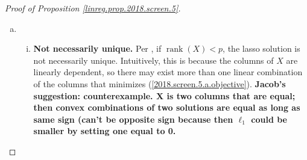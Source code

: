 \begin{proof}[Proof of Proposition \ref{linreg.prop.2018.screen.5}]
\begin{enumerate}[(a)]
Then since (\ref{2018.screen.5.a.other.part.result}) is a requirement for dual feasibility of \(u\) and strong duality applies, we have \(\hat{u} = y - X \hat{\beta}\).

\begin{remark}

Note that we could also find the arguments maximizing (\ref{2018.screen.5.a.dual.ans}) by

\[
\begin{aligned}
& \underset{u \in \mathbb{R}^p}{\arg \min}
& & -\frac{1}{2} \lVert y \rVert_2^2 + \frac{1}{2} \lVert y - u \rVert_2^2  \\
& \text{subject to}
& & \lVert u^TX \rVert_\infty \leq \lambda.
\end{aligned} = \begin{aligned}
& \underset{u \in \mathbb{R}^p}{\arg \min}
& &  \frac{1}{2} \lVert y - u \rVert_2^2  \\
& \text{subject to}
& & \lVert u^TX \rVert_\infty \leq \lambda.
\end{aligned}
\]

where the first step follows from the fact that arguments that maximize a function are the same as the arguments that minimize the negative of a function, and the second step follows from the fact that the \( -\frac{1}{2} \lVert y \rVert_2^2\) term does not include \(u\). Therefore we see that the residual vector \(u\) from a lasso fit can be thought of as the projection of \(y\) onto the convex polyhedron \(C \subset \mathbb{R}^n\) defined by \(C := \{u: \lVert X^Tu \rVert_\infty \leq \lambda \}\).

Another way of saying this is that the lasso estimate \(\hat{y} = X \hat{\beta}_{\text{lasso}}\) itself is the residual from projecting \(y\) onto \(C\); that is,

\[
X \hat{\beta}_{\text{lasso}} = (I - P_C)y,
\]

where \(P_C\) is the operator projecting \(y\) onto \(C\).

\end{remark}

\item

\begin{enumerate}[(i)]

\item \textbf{Not necessarily unique.} Per \citet{Tibshirani2013}, if \(\operatorname{rank}(X) < p\), the lasso solution is not necessarily unique. Intuitively, this is because the columns of \(X\) are linearly dependent, so there may exist more than one linear combination of the columns that minimizes (\ref{2018.screen.5.a.objective}). \textbf{Jacob's suggestion: counterexample. X is two columns that are equal; then convex combinations of two solutions are equal as long as same sign (can't be opposite sign because then \(\ell_1\) could be smaller by setting one equal to 0.}


\end{enumerate}
\end{enumerate}
\end{proof}
